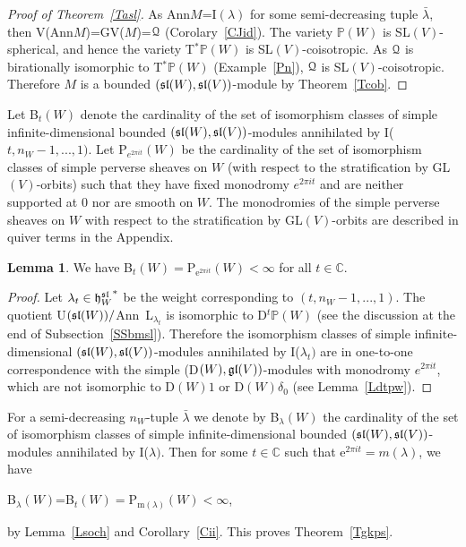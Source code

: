 \documentclass[12pt]{amsart}
\theoremstyle{definition}\newtheorem{theorem}{Theorem}[section]
\newtheorem{lemma}[proposition]{Lemma}
\theoremstyle{definition}\newtheorem{definition}[proposition]{Definition}
\theoremstyle{remark}\newtheorem{example}[proposition]{Example}
\begin{document}
\begin{proof}[Proof of Theorem~\ref{Tasl}]As Ann$M$=I$(\lambda)$ for some semi-decreasing tuple $\bar\lambda$, then V(Ann$M$)=GV($M$)=$\EuScript Q$ (Corolary~\ref{CJid}). The variety $\mathbb P(W)$ is SL$(V)$-spherical, and hence the variety T$^*\mathbb P(W)$ is SL$(V)$-coisotropic. As $\EuScript Q$ is birationally isomorphic to T$^*\mathbb P(W)$ (Example~\ref{Pn}), $\EuScript Q$ is SL$(V)$-coisotropic. Therefore $M$ is a bounded $(\frak{sl}(W), \frak{sl}(V))$-module by Theorem~\ref{Tcob}.\end{proof}
Let B$_t(W)$ denote the cardinality of the set of isomorphism classes of simple infinite-dimensional bounded $(\frak{sl}(W), \frak{sl}(V))$-modules annihilated by I($t, n_W-1,..., 1)$. Let P$_{e^{2\pi it}}(W)$ be the cardinality of the set of isomorphism classes of simple perverse sheaves on $W$ (with respect to the stratification by GL$(V)$-orbits) such that they have fixed monodromy $e^{2\pi it}$ and are neither supported at 0 nor are smooth on $W$. The monodromies of the simple perverse sheaves on $W$ with respect to the stratification by GL$(V)$-orbits are described in quiver terms in the Appendix.
\begin{lemma}\label{Ldps}We have B$_t(W)=$P$_{\mathrm e^{2\pi it}}(W)<\infty$ for all $t\in\mathbb C$.\end{lemma}
\begin{proof} Let ${\lambda_t\in\frak h_W^\frak{sl}}^*$ be the weight corresponding to $(t, n_W-1,..., 1)$. The quotient U$(\frak{sl}(W))/$Ann~L$_{\lambda_t}$ is isomorphic to D$^t\mathbb P(W)$ (see the discussion at the end of Subsection~\ref{SSbmsl}). Therefore the isomorphism classes of simple infinite-dimensional $(\frak{sl}(W), \frak{sl}(V))$-modules annihilated by I($\lambda_t)$ are in one-to-one correspondence with the simple (D$(W), \frak{gl}(V))$-modules with monodromy $e^{2\pi it}$, which are not isomorphic to D$(W)1$ or D$(W)\delta_0$ (see Lemma~\ref{Ldtpw}).\end{proof}
For a semi-decreasing $n_W$-tuple $\bar\lambda$ we denote by B$_\lambda(W)$ the cardinality of the set of isomorphism classes of simple infinite-dimensional bounded $(\frak{sl}(W), \frak{sl}(V))$-modules annihilated by I($\lambda)$. Then for some $t\in\mathbb C$ such that e$^{2\pi it}=m(\lambda)$, we have \begin{center}B$_\lambda(W)$=B$_t(W)=$P$_{\mathrm m(\lambda)}(W)<\infty$,\end{center} by Lemma~\ref{Lsoch} and Corollary~\ref{Cii}. This proves Theorem~\ref{Tgkps}.
\end{document}
